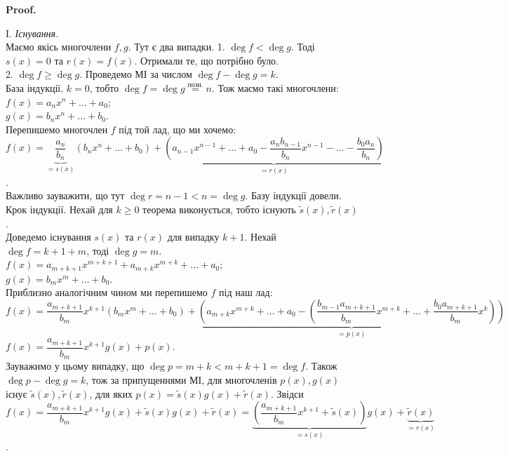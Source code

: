 \documentclass[a4paper, 10pt]{extarticle}
\makeatletter
\def\qed{$\blacksquare$}
\def\qed{$\blacksquare$}
\theoremstyle{theoremdd}
\theoremstyle{theoremdd}
\theoremstyle{theoremdd}
\theoremstyle{theoremdd}
\theoremstyle{theoremdd}
\theoremstyle{theoremdd}
\theoremstyle{theoremdd}
\theoremstyle{theoremdd}
\renewenvironment{proof}[1][Proof.\\]{\par
\pushQED{\hfill \qed}%
\normalfont \topsep6\p@\@plus6\p@\relax
\trivlist
\item\relax
{\bfseries
#1\@addpunct{.}}\hspace\labelsep\ignorespaces
}{%
\popQED\endtrivlist\@endpefalse
}
\makeatother
\begin{document}
\begin{proof}
I. \textit{Існування.}\\
Маємо якісь многочлени $f,g$. Тут є два випадки.
1. $\deg f < \deg g$. Тоді $s(x) = 0$ та $r(x) = f(x)$. Отримали те, що потрібно було.
\bigskip \\
2. $\deg f \geq \deg g$. Проведемо МІ за числом $\deg f -\deg g = k$.\\
База індукції. $k = 0$, тобто $\deg f = \deg g \overset{\text{позн.}}{=} n$.
Тож маємо такі многочлени:\\
$f(x) = a_n x^n + \dots + a_0$;\\
$g(x) = b_n x^n + \dots + b_0$.\\
Перепишемо многочлен $f$ під той лад, що ми хочемо:\\
$f(x) = \underbrace{\dfrac{a_n}{b_n}}_{=s(x)} (b_n x^n + \dots + b_0) + \underbrace{\left(a_{n-1}x^{n-1}+\dots+a_0 - \dfrac{a_n b_{n-1}}{b_n}x^{n-1}- \dots - \dfrac{b_0 a_n}{b_n} \right)}_{= r(x)}$.\\
Важливо зауважити, що тут $\deg r =n-1 < n = \deg g$. Базу індукції довели.
\bigskip \\
Крок індукції. Нехай для $k \geq 0$ теорема виконується, тобто існують $\tilde{s}(x), \tilde{r}(x)$.
\bigskip \\
Доведемо існування $s(x)$ та $r(x)$ для випадку $k+1$. Нехай $\deg f = k+1+m$, тоді $\deg g = m$.\\
$f(x) = a_{m+k+1} x^{m+k+1} + a_{m+k}x^{m+k} + \dots + a_0$;\\
$g(x) = b_m x^m + \dots + b_0$.\\
Приблизно аналогічним чином ми перепишемо $f$ під наш лад:\\
$f(x) = \dfrac{a_{m+k+1}}{b_m}x^{k+1} (b_m x^m + \dots + b_0)
+ \underbrace{\left(a_{m+k}x^{m+k} + \dots + a_0 - \left(\dfrac{b_{m-1}a_{m+k+1}}{b_m}x^{m+k} + \dots + \dfrac{b_0 a_{m+k+1}}{b_m}x^k \right) \right)}_{=p(x)}$\\
$f(x) = \dfrac{a_{m+k+1}}{b_m}x^{k+1}g(x) + p(x)$.\\
Зауважимо у цьому випадку, що $\deg p = m+k < m+k+1 = \deg f$. Також $\deg p - \deg g = k$, тож за припущеннями МІ, для многочленів $p(x),g(x)$ існує $\tilde{s}(x), \tilde{r}(x)$, для яких $p(x) = \tilde{s}(x) g(x) + \tilde{r}(x)$. Звідси\\
$f(x) = \dfrac{a_{m+k+1}}{b_m}x^{k+1}g(x) + \tilde{s}(x)g(x) + \tilde{r}(x) = \underbrace{\left(\dfrac{a_{m+k+1}}{b_m}x^{k+1} + \tilde{s}(x) \right)}_{=s(x)}g(x) + \underbrace{\tilde{r}(x)}_{=r(x)}$.\\

\end{proof}
\end{document}
